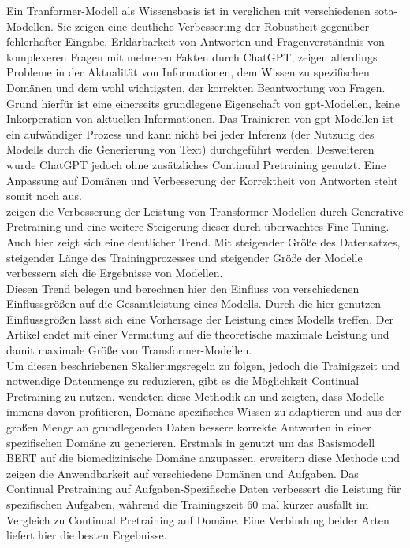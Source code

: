 Ein Tranformer-Modell als Wissensbasis ist in \citet{chatgpt_qas} verglichen mit verschiedenen \ac{sota}-Modellen. 
Sie zeigen eine deutliche Verbesserung der Robustheit gegenüber fehlerhafter Eingabe, Erklärbarkeit von Antworten und Fragenverständnis von komplexeren Fragen mit mehreren Fakten durch ChatGPT, zeigen allerdings Probleme in der Aktualität von Informationen, dem Wissen zu spezifischen Domänen und dem wohl wichtigsten, der korrekten Beantwortung von Fragen. 
Grund hierfür ist eine einerseits grundlegene Eigenschaft von \ac{gpt}-Modellen, keine Inkorperation von aktuellen Informationen. 
Das Trainieren von \ac{gpt}-Modellen ist ein aufwändiger Prozess und kann nicht bei jeder Inferenz (der Nutzung des Modells durch die Generierung von Text) durchgeführt werden. 
Desweiteren wurde ChatGPT jedoch ohne zusätzliches Continual Pretraining genutzt.
Eine Anpassung auf Domänen und Verbesserung der Korrektheit von Antworten steht somit noch aus.\\

\citet{improve_language} zeigen die Verbesserung der Leistung von Transformer-Modellen durch Generative Pretraining und eine weitere Steigerung dieser durch überwachtes Fine-Tuning.
Auch hier zeigt sich eine deutlicher Trend. Mit steigender Größe des Datensatzes, steigender Länge des Trainingprozesses und steigender Größe der Modelle verbessern sich die Ergebnisse von Modellen.\\

Diesen Trend belegen \citet{scaling_laws} und berechnen hier den Einfluss von verschiedenen Einflussgrößen auf die Gesamtleistung eines Modells. Durch die hier genutzen Einflussgrößen lässt sich eine Vorhersage der Leistung eines Modells treffen. 
Der Artikel endet mit einer Vermutung auf die theoretische maximale Leistung und damit maximale Größe von Transformer-Modellen.\\

Um diesen beschriebenen Skalierungsregeln zu folgen, jedoch die Trainigszeit und notwendige Datenmenge zu reduzieren, gibt es die Möglichkeit Continual Pretraining zu nutzen. 
\citet{dont_stop_pretraining} wendeten diese Methodik an und zeigten, dass Modelle immens davon profitieren, Domäne-spezifisches Wissen zu adaptieren und aus der großen Menge an grundlegenden Daten bessere korrekte Antworten in einer spezifischen Domäne zu generieren. 
Erstmals in \citet{biobert} genutzt um das Basismodell BERT auf die biomedizinische Domäne anzupassen, erweitern \citet{dont_stop_pretraining} diese Methode und zeigen die Anwendbarkeit auf verschiedene Domänen und Aufgaben. 
Das Continual Pretraining auf Aufgaben-Spezifische Daten verbessert die Leistung für spezifischen Aufgaben, während die Trainingszeit 60 mal kürzer ausfällt im Vergleich zu Continual Pretraining auf Domäne. 
Eine Verbindung beider Arten liefert hier die besten Ergebnisse.\\

